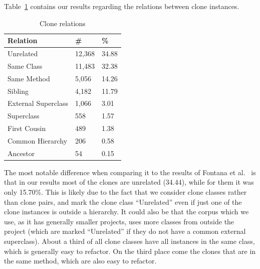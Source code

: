 \documentclass[a4paper]{article}
\begin{document}
Table~\ref{table:relations} contains our results regarding the relations between clone instances.

\begin{table}[H]
  \begin{center}
  \caption{Clone relations} \label{table:relations}
  \medskip
\begin{tabular}{|l|l|l|} \hline
\textbf{Relation} & \textbf{\#} & \textbf{\%} \\ \hline
Unrelated          & 12,368 & 34.88            \\ \hline
Same Class          & 11,483 & 32.38             \\ \hline
Same Method               & 5,056 & 14.26            \\ \hline
Sibling         & 4,182 & 11.79             \\ \hline
External Superclass   & 1,066 & 3.01             \\ \hline
Superclass          & 558 & 1.57           \\ \hline
First Cousin          & 489 & 1.38           \\ \hline
Common Hierarchy    & 206 & 0.58            \\ \hline
Ancestor          & 54 & 0.15          \\ \hline
\end{tabular}
\end{center}
\end{table}

The most notable difference when comparing it to the results of Fontana et al.~\cite{fontana2015duplicated} is that in our results most of the clones are unrelated (34.44), while for them it was only 15.70\%. This is likely due to the fact that we consider clone classes rather than clone pairs, and mark the clone class ``Unrelated'' even if just one of the clone instances is outside a hierarchy. It could also be that the corpus which we use, as it has generally smaller projects, uses more classes from outside the project (which are marked ``Unrelated'' if they do not have a common external superclass). About a third of all clone classes have all instances in the same class, which is generally easy to refactor. On the third place come the clones that are in the same method, which are also easy to refactor.
\end{document}
